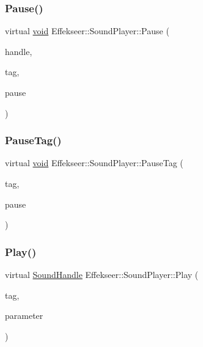 \subsubsection{\texorpdfstring{Pause()}{Pause()}}
{\footnotesize\ttfamily virtual \mbox{\hyperlink{namespace_effekseer_ab34c4088e512200cf4c2716f168deb56}{void}} Effekseer\+::\+Sound\+Player\+::\+Pause (\begin{DoxyParamCaption}\item[{\mbox{\hyperlink{namespace_effekseer_a694a300b9b688ca40f6a0d9841d437bf}{Sound\+Handle}}}]{handle,  }\item[{\mbox{\hyperlink{namespace_effekseer_adb219197297396cf2ab9bee657551a29}{Sound\+Tag}}}]{tag,  }\item[{bool}]{pause }\end{DoxyParamCaption})\hspace{0.3cm}{\ttfamily [pure virtual]}}

\mbox{\label{class_effekseer_1_1_sound_player_a331ad801eed06611fffc50354837b70e}} 
\subsubsection{\texorpdfstring{Pause\+Tag()}{PauseTag()}}
{\footnotesize\ttfamily virtual \mbox{\hyperlink{namespace_effekseer_ab34c4088e512200cf4c2716f168deb56}{void}} Effekseer\+::\+Sound\+Player\+::\+Pause\+Tag (\begin{DoxyParamCaption}\item[{\mbox{\hyperlink{namespace_effekseer_adb219197297396cf2ab9bee657551a29}{Sound\+Tag}}}]{tag,  }\item[{bool}]{pause }\end{DoxyParamCaption})\hspace{0.3cm}{\ttfamily [pure virtual]}}

\mbox{\label{class_effekseer_1_1_sound_player_aaea571e89a22b2b0a8971bfb52176622}} 
\subsubsection{\texorpdfstring{Play()}{Play()}}
{\footnotesize\ttfamily virtual \mbox{\hyperlink{namespace_effekseer_a694a300b9b688ca40f6a0d9841d437bf}{Sound\+Handle}} Effekseer\+::\+Sound\+Player\+::\+Play (\begin{DoxyParamCaption}\item[{\mbox{\hyperlink{namespace_effekseer_adb219197297396cf2ab9bee657551a29}{Sound\+Tag}}}]{tag,  }\item[{const \mbox{\hyperlink{struct_effekseer_1_1_sound_player_1_1_instance_parameter}{Instance\+Parameter}} \&}]{parameter }\end{DoxyParamCaption})\hspace{0.3cm}{\ttfamily [pure virtual]}}

